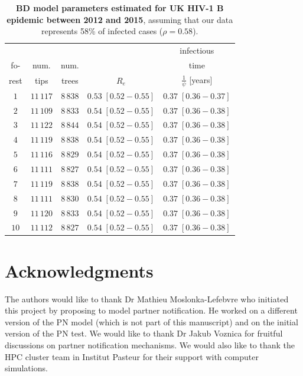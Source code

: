 \documentclass[10pt,letterpaper]{article}
\begin{document}
\begin{table}[!ht]
\centering
\caption{
{\bf BD model parameters estimated for UK HIV-1 B epidemic between 2012 and 2015}, assuming that our data represents 58\% of infected cases ($\rho=0.58$).}

\begin{tabular}{c|cc|cc}
&&&&infectious\\
fo-&num.&num.&&time\\
rest&tips&trees&$R_e$&$\frac{1}{\psi}$ [years]\\
\toprule
 $1$ & $11\,117$ & $8\,838$ & $0.53\;[0.52-0.55]$& $0.37\;[0.36-0.37]$ \\
 $2$ & $11\,109$ & $8\,833$ & $0.54\;[0.52-0.55]$& $0.37\;[0.36-0.38]$\\
 $3$ & $11\,122$ & $8\,844$ & $0.54\;[0.52-0.55]$& $0.37\;[0.36-0.38]$\\
 $4$ & $11\,119$ & $8\,838$ & $0.54\;[0.52-0.55]$& $0.37\;[0.36-0.38]$\\
 $5$ & $11\,116$ & $8\,829$ & $0.54\;[0.52-0.55]$& $0.37\;[0.36-0.38]$\\
 $6$ & $11\,111$ & $8\,827$ & $0.54\;[0.52-0.55]$& $0.37\;[0.36-0.38]$\\
 $7$ & $11\,119$ & $8\,838$ & $0.54\;[0.52-0.55]$& $0.37\;[0.36-0.38]$\\
 $8$ & $11\,111$ & $8\,830$ & $0.54\;[0.52-0.55]$& $0.37\;[0.36-0.38]$\\
 $9$ & $11\,120$ & $8\,833$ & $0.54\;[0.52-0.55]$& $0.37\;[0.36-0.38]$\\
 $10$ & $11\,112$ & $8\,827$ & $0.54\;[0.52-0.55]$& $0.37\;[0.36-0.38]$\\
 \bottomrule
 \end{tabular}
\label{tbl:uk}
\end{table}

\section*{Acknowledgments}
The authors would like to thank Dr Mathieu Moslonka-Lefebvre who initiated this project by proposing to model partner notification. He worked on a different version of the PN model (which is not part of this manuscript) and on the initial version of the PN test. We would like to thank Dr Jakub Voznica for fruitful discussions on partner notification mechanisms.
We would also like to thank the HPC cluster team in Institut Pasteur for their support with computer simulations.
\end{document}

